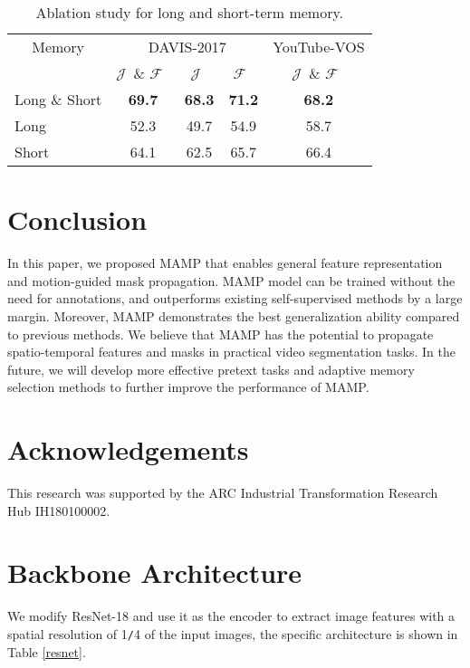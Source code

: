 \documentclass[letterpaper]{article} \usepackage{aaai22}  \usepackage{times}  \usepackage{helvet}  \usepackage{courier}  \usepackage[hyphens]{url}  \usepackage{graphicx} \urlstyle{rm} \def\UrlFont{\rm}  \usepackage{natbib}  \usepackage{caption} \DeclareCaptionStyle{ruled}{labelfont=normalfont,labelsep=colon,strut=off} \frenchspacing  \setlength{\pdfpagewidth}{8.5in}  \setlength{\pdfpageheight}{11in}  \usepackage{algorithm}
\begin{document}
\begin{table}[t]
\small
\centering
\begin{tabular}{lcccc}
\toprule[1.5pt]
\multicolumn{1}{c}{Memory} & \multicolumn{3}{c}{DAVIS-2017} & \multicolumn{1}{c}{YouTube-VOS}\\
\cmidrule(lr){2-4}\cmidrule(lr){5-5} & \( \mathcal{J} \)\ \& \( \mathcal{F} \)\ & \( \mathcal{J} \)\ & \( \mathcal{F} \)\ & \( \mathcal{J} \)\ \& \( \mathcal{F} \)\ \\
\hline
Long \& Short & \textbf{69.7} & \textbf{68.3} & \textbf{71.2} & \textbf{68.2} \\
\hline
Long & 52.3 & 49.7 & 54.9 & 58.7 \\
Short & 64.1 & 62.5 & 65.7 & 66.4 \\
\toprule[1.5pt]
\end{tabular}
\caption{Ablation study for long and short-term memory.}
\label{abmem}
\end{table}



\section{Conclusion}
In this paper, we proposed MAMP that enables general feature representation and motion-guided mask propagation. MAMP model can be trained without the need for annotations, and outperforms existing self-supervised methods by a large margin. Moreover, MAMP demonstrates the best generalization ability compared to previous methods. We believe that MAMP has the potential to propagate spatio-temporal features and masks in practical video segmentation tasks. In the future, we will develop more effective pretext tasks and adaptive memory selection methods to further improve the performance of MAMP.

\section{Acknowledgements}
\vspace{-1mm}
This research was supported by the ARC Industrial Transformation Research Hub IH180100002.





\newpage
\newpage
\appendix
\section{Backbone Architecture}
\vspace{2mm}
We modify ResNet-18 and use it as the encoder to extract image features with a spatial resolution of 1\verb|/|4 of the input images, the specific architecture is shown in Table \ref{resnet}.
\end{document}
